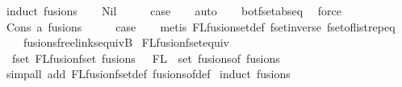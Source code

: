 \begin{isabellebody}
\isamarkupfalse%
\ {\isacharparenleft}{\kern0pt}induct\ fusions{\isacharparenright}{\kern0pt}\isanewline
\ \ \isamarkupfalse%
\ Nil\isanewline
\ \ \isamarkupfalse%
\ \isamarkupfalse%
\ {\isacharquery}{\kern0pt}case\isanewline
\ \ \isamarkupfalse%
\ auto\isanewline
\ \ \isamarkupfalse%
\ bot{\isacharunderscore}{\kern0pt}fset{\isachardot}{\kern0pt}abs{\isacharunderscore}{\kern0pt}eq\ \isamarkupfalse%
\ force\isanewline
{}\isamarkupfalse%
\isanewline
\ \ \isamarkupfalse%
\ {\isacharparenleft}{\kern0pt}Cons\ a\ fusions{\isacharparenright}{\kern0pt}\isanewline
\ \ \isamarkupfalse%
\ \isamarkupfalse%
\ {\isacharquery}{\kern0pt}case\isanewline
\ \ \isamarkupfalse%
\ {\isacharparenleft}{\kern0pt}metis\ FLfusion{\isacharunderscore}{\kern0pt}set{\isacharunderscore}{\kern0pt}def\ fset{\isacharunderscore}{\kern0pt}inverse\ fset{\isacharunderscore}{\kern0pt}of{\isacharunderscore}{\kern0pt}list{\isachardot}{\kern0pt}rep{\isacharunderscore}{\kern0pt}eq\isanewline
\ \ \ \ fusions{\isacharunderscore}{\kern0pt}freelinks{\isacharunderscore}{\kern0pt}equiv{}B{\isacharparenright}{\kern0pt}\isanewline
{}\isamarkupfalse%
%
\endisatagproof
{\isafoldproof}%
%
\isadelimproof
\isanewline
%
\endisadelimproof
\isanewline
\isanewline
\isanewline
{}\isamarkupfalse%
\ FLfusion{\isacharunderscore}{\kern0pt}fset{\isacharunderscore}{\kern0pt}equiv{\isacharcolon}{\kern0pt}\isanewline
\ \ {\isachardoublequoteopen}fset\ {\isacharparenleft}{\kern0pt}FLfusion{\isacharunderscore}{\kern0pt}fset\ fusions{\isacharparenright}{\kern0pt}\ {\isacharequal}{\kern0pt}\ {\isasymUnion}\ {\isacharparenleft}{\kern0pt}FL\ {\isacharbackquote}{\kern0pt}\ set\ {\isacharparenleft}{\kern0pt}fusions{\isacharunderscore}{\kern0pt}of\ fusions{\isacharparenright}{\kern0pt}{\isacharparenright}{\kern0pt}{\isachardoublequoteclose}\isanewline
%
\isadelimproof
%
\endisadelimproof
%
\isatagproof
{}\isamarkupfalse%
\ {\isacharparenleft}{\kern0pt}simp{\isacharunderscore}{\kern0pt}all\ add{\isacharcolon}{\kern0pt}\ FLfusion{\isacharunderscore}{\kern0pt}fset{\isacharunderscore}{\kern0pt}def\ fusions{\isacharunderscore}{\kern0pt}of{\isacharunderscore}{\kern0pt}def{\isacharparenright}{\kern0pt}\isanewline
{}\isamarkupfalse%
\ {\isacharparenleft}{\kern0pt}induct\ fusions{\isacharparenright}{\kern0pt}\isanewline

\end{isabellebody}
